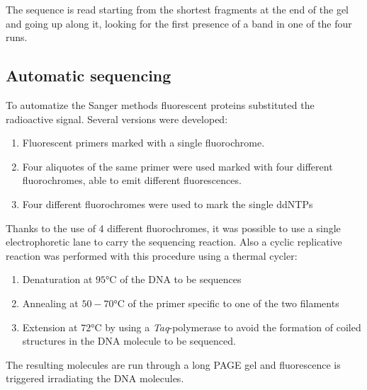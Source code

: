 The sequence is read starting from the shortest fragments at the end of the gel and going up along it, looking for the first presence of a band in one of the four runs.

    \subsection{Automatic sequencing}
    To automatize the Sanger methods fluorescent proteins substituted the radioactive signal.
    Several versions were developed:

    \begin{multicols}{2}
        \begin{enumerate}
          \item Fluorescent primers marked with a single fluorochrome.
          \item Four aliquotes of the same primer were used marked with four different fluorochromes, able to emit different fluorescences.
          \item Four different fluorochromes were used to mark the single ddNTPs
        \end{enumerate}
    \end{multicols}

    Thanks to the use of 4 different fluorochromes, it was possible to use a single electrophoretic lane to carry the sequencing reaction.
    Also a cyclic replicative reaction was performed with this procedure using a thermal cycler:

    \begin{multicols}{2}
        \begin{enumerate}
          \item Denaturation at $95$°C of the DNA to be sequences
          \item Annealing at $50-70$°C of the primer specific to one of the two filaments
          \item Extension at $72$°C by using a \textit{Taq}-polymerase to avoid the formation of coiled structures in the DNA molecule to be sequenced.
        \end{enumerate}
    \end{multicols}

    The resulting molecules are run through a long PAGE gel and fluorescence is triggered irradiating the DNA molecules.


